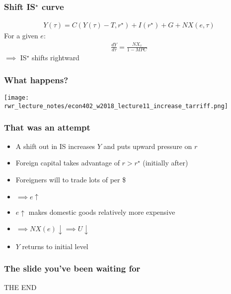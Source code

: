 \documentclass[presentation,dvipsnames]{beamer}
\renewcommand{\pounds}{\text{\textsterling}{ }}
\begin{document}
\begin{frame}
\frametitle{Shift IS$^{\star}$ curve}
\begin{align*}
Y(\tau) = C(Y(\tau) - T, r^{\star}) + I(r^{\star}) + G + NX(e,\tau)
\end{align*}
For a given $e$:
\begin{align*}
\frac{dY}{d\tau} = \frac{NX_{\tau}}{1-MPC}
\end{align*}
$\implies$ IS$^{\star}$ shifts rightward
\end{frame}

\begin{frame}
\frametitle{What happens?}
\centerline{\texttt{[image: rwr\_lecture\_notes/econ402\_w2018\_lecture11\_increase\_tarriff.png]}}
\end{frame}

\begin{frame}
\frametitle{That was an attempt}
\begin{itemize}[label={--}]
\item A shift out in IS increases $Y$ and puts upward pressure on $r$
\item Foreign capital takes advantage of $r > r^{\star}$ (initially after)
\item Foreigners will to trade lots of \pounds per \$
\item $\implies e \uparrow$ 
\item $e \uparrow$ makes domestic goods relatively more expensive
\item $\implies NX(e) \downarrow \implies U \downarrow$
\item $Y$ returns to initial level
\end{itemize}
\end{frame}

\begin{frame}
\frametitle{The slide you've been waiting for}
\centering
{\Huge THE END}
\end{frame}


\end{document}
